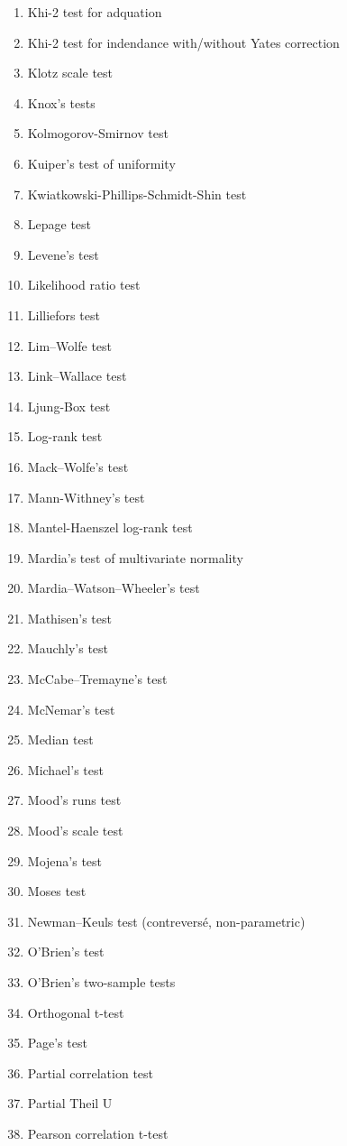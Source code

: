 \begin{itemize}
\begin{multicols}{3}
\begin{enumerate}
			\item Khi-2 test for adquation
			\item Khi-2 test for indendance with/without Yates correction
			\item Klotz scale test
			\item Knox's tests
			\item Kolmogorov-Smirnov test
			\item Kuiper's test of uniformity
			\item Kwiatkowski-Phillips-Schmidt-Shin test
			\item Lepage test
			\item Levene's test
			\item Likelihood ratio test
			\item Lilliefors test
			\item Lim–Wolfe test
			\item Link–Wallace test
			\item Ljung-Box test
			\item Log-rank test
			\item Mack–Wolfe's test
			\item Mann-Withney's test
			\item Mantel-Haenszel log-rank test
			\item Mardia's test of multivariate normality
			\item Mardia–Watson–Wheeler's test
			\item Mathisen's test
			\item Mauchly's test
			\item McCabe–Tremayne's test
			\item McNemar's test
			\item Median test
			\item Michael's test
			\item Mood's runs test
			\item Mood's scale test
			\item Mojena's test
			\item Moses test
			\item Newman–Keuls test (contreversé, non-parametric)
			\item O'Brien's test
			\item O'Brien's two-sample tests
			\item Orthogonal t-test 
			\item Page's test
			\item Partial correlation test
			\item Partial Theil U
			\item Pearson correlation t-test

\end{enumerate}
\end{multicols}
\end{itemize}

